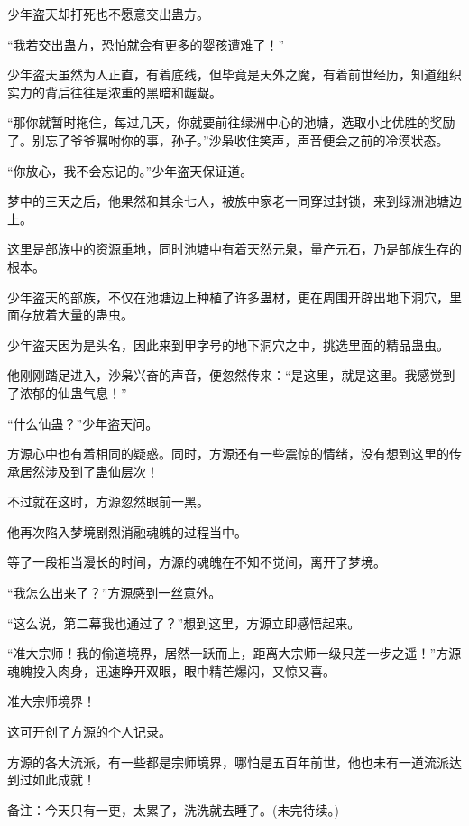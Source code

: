 \begin{this_body}
少年盗天却打死也不愿意交出蛊方。

“我若交出蛊方，恐怕就会有更多的婴孩遭难了！”

少年盗天虽然为人正直，有着底线，但毕竟是天外之魔，有着前世经历，知道组织实力的背后往往是浓重的黑暗和龌龊。

“那你就暂时拖住，每过几天，你就要前往绿洲中心的池塘，选取小比优胜的奖励了。别忘了爷爷嘱咐你的事，孙子。”沙枭收住笑声，声音便会之前的冷漠状态。

“你放心，我不会忘记的。”少年盗天保证道。

梦中的三天之后，他果然和其余七人，被族中家老一同穿过封锁，来到绿洲池塘边上。

这里是部族中的资源重地，同时池塘中有着天然元泉，量产元石，乃是部族生存的根本。

少年盗天的部族，不仅在池塘边上种植了许多蛊材，更在周围开辟出地下洞穴，里面存放着大量的蛊虫。

少年盗天因为是头名，因此来到甲字号的地下洞穴之中，挑选里面的精品蛊虫。

他刚刚踏足进入，沙枭兴奋的声音，便忽然传来：“是这里，就是这里。我感觉到了浓郁的仙蛊气息！”

“什么仙蛊？”少年盗天问。

方源心中也有着相同的疑惑。同时，方源还有一些震惊的情绪，没有想到这里的传承居然涉及到了蛊仙层次！

不过就在这时，方源忽然眼前一黑。

他再次陷入梦境剧烈消融魂魄的过程当中。

等了一段相当漫长的时间，方源的魂魄在不知不觉间，离开了梦境。

“我怎么出来了？”方源感到一丝意外。

“这么说，第二幕我也通过了？”想到这里，方源立即感悟起来。

“准大宗师！我的偷道境界，居然一跃而上，距离大宗师一级只差一步之遥！”方源魂魄投入肉身，迅速睁开双眼，眼中精芒爆闪，又惊又喜。

准大宗师境界！

这可开创了方源的个人记录。

方源的各大流派，有一些都是宗师境界，哪怕是五百年前世，他也未有一道流派达到过如此成就！

备注：今天只有一更，太累了，洗洗就去睡了。(未完待续。)

\end{this_body}

